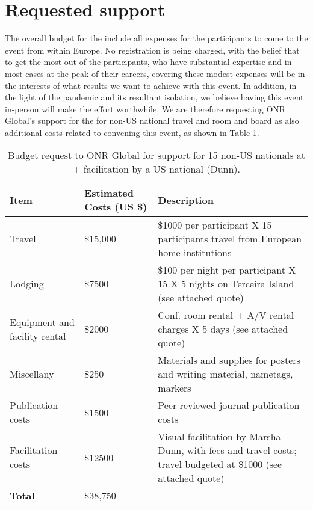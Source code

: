 \section{Requested  support}

The overall budget for the \symp include all expenses for the
participants to come to the event from within Europe. No registration
is being charged, with the belief that to get the most out of the
participants, who have substantial expertise and in most cases at the
peak of their careers, covering these modest expenses will be in the
interests of what results we want to achieve with this event. In
addition, in the light of the pandemic and its resultant isolation, we
believe having this event in-person will make the effort worthwhile.
We are therefore requesting ONR Global's support for the \symp for
non-US national travel and room and board as also additional costs
related to convening this event, as shown in Table
\ref{tab:nsf-budget}.

\begin{table}[!h]
  \footnotesize{
    \centering    
    \begin{tabular}{|p{3.0cm}|p{1.6cm}|p{10cm}|}
      \hline 
      \rowcolor{Gray}
      \bfseries Item& \bfseries Estimated Costs (US \$)&\bfseries Description\\
      \hline
      Travel & \$15,000 & \$1000 per participant X 15 participants
                          travel from European home institutions\\ 
      \hline
      Lodging& \$7500 & \$100 per night per participant X 15 X 5
                        nights on Terceira Island (see attached quote)\\
      \hline
      Equipment and facility rental &\$2000 & Conf. room rental + A/V
                                              rental charges X 5 days
                                              (see attached quote)\\
      \hline
      Miscellany& \$250 & Materials and supplies for posters and writing material,
                          nametags, markers\\
      \hline
      Publication costs& \$1500 & Peer-reviewed journal publication
                                  costs\\
      \hline
      Facilitation costs& \$12500 & Visual facilitation by Marsha
                                    Dunn, with fees and travel
                                    costs; travel budgeted at \$1000 (see attached quote)\\
      \hline
      \textbf{Total}& \$38,750&\\
      \hline        
  \end{tabular}
  \caption{Budget request to ONR Global for support for 15 non-US
    nationals at \sympe + facilitation by a US national (Dunn).}
  \label{tab:nsf-budget}
}
\end{table}

